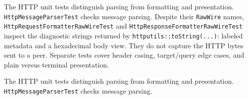 \documentclass[
  a4paper,
  openany]{book}
\providecommand{\passthrough}[1]{#1}
\begin{document}
\begingroup\raggedright The HTTP unit tests distinguish parsing from formatting and
presentation. \passthrough{\lstinline!HttpMessageParserTest!} checks
message parsing. Despite their \passthrough{\lstinline!RawWire!} names,
\passthrough{\lstinline!HttpRequestFormatterRawWireTest!} and
\passthrough{\lstinline!HttpResponseFormatterRawWireTest!} inspect the
diagnostic strings returned by
\passthrough{\lstinline!httputils::toString(...)!}: labeled metadata and
a hexadecimal body view. They do not capture the HTTP bytes sent to a
peer. Separate tests cover header casing, target/query edge cases, and
plain versus terminal presentation.\par\endgroup
\clearpage
{}
The HTTP unit tests distinguish parsing from formatting and
presentation. \passthrough{\lstinline!HttpMessageParserTest!} checks
message parsing.
\end{document}

